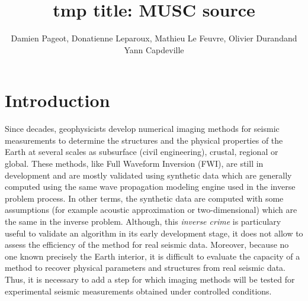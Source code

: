 \documentclass[manuscript,revised]{geophysics}
\begin{document}
\title{tmp title: MUSC source}

\renewcommand{\thefootnote}{\fnsymbol{footnote}} 


\address{
\footnotemark[1]LUNAM-IFSTTAR, \\
\footnotemark[2]OSUNA \\
\footnotemark[1]LPGN, \\}
\author{Damien Pageot\footnotemark[1]\footnotemark[2], Donatienne Leparoux\footnotemark[1], Mathieu Le Feuvre\footnotemark[1], Olivier Durand\footnotemark[1] and Yann Capdeville\footnotemark[3]}


\maketitle

\begin{abstract}
\end{abstract}

\section{Introduction}

\noindent Since decades, geophysicists develop numerical imaging methods for seismic measurements to determine the structures and the physical properties of the Earth at several scales as subsurface (civil engineering), crustal, regional or global. These methods, like Full Waveform Inversion (FWI), are still in development and are mostly validated using synthetic data which are generally computed using the same wave propagation modeling engine used in the inverse problem process. In other terms, the synthetic data are computed with some assumptions (for example acoustic approximation or two-dimensional) which are the same in the inverse problem. Although, this \textit{inverse crime} \citep{Wirgin_TIC_2004} is particulary useful to validate an algorithm in its early development stage, it does not allow to assess the efficiency of the method for real seismic data. Moreover, because no one known precisely the Earth interior, it is difficult to evaluate the capacity of a method to recover physical parameters and structures from real seismic data. Thus, it is necessary to add a step for which imaging methods will be tested for experimental seismic measurements obtained under controlled conditions.      
\end{document}
